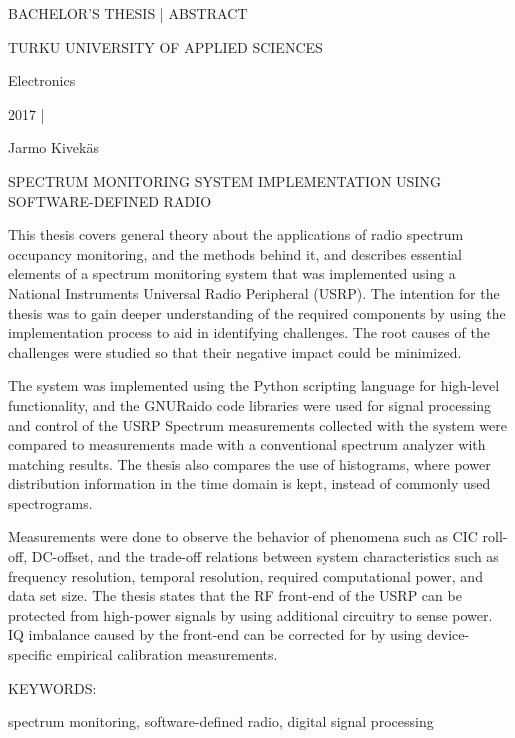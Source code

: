 BACHELOR'S THESIS | ABSTRACT

TURKU UNIVERSITY OF APPLIED SCIENCES

Electronics

2017 | \pageref{LastPage}


\vspace{7mm}
{\Large Jarmo Kivekäs \par}

\vspace{7mm}
{\huge SPECTRUM MONITORING SYSTEM IMPLEMENTATION USING SOFTWARE-DEFINED RADIO \par}

\vspace{7mm}




This thesis covers general theory about the applications of radio spectrum occupancy
monitoring, and the methods behind it, and describes essential elements of a
spectrum monitoring system that was implemented using a National Instruments Universal Radio Peripheral (USRP).
The intention for the thesis was to gain deeper understanding of the required components
by using the implementation process to aid in identifying challenges.
The root causes of the challenges were studied so that their negative impact could be minimized.

The system was implemented using the Python scripting language for high-level functionality, and the GNURaido
code libraries were used for signal processing and control of the USRP
Spectrum measurements collected with the system were compared to measurements made with a conventional spectrum analyzer with matching results.
The thesis also compares the use of histograms, where power distribution information in the time domain is kept, instead of commonly used spectrograms.


Measurements were done to observe the behavior of phenomena such as CIC roll-off,
DC-offset, and the trade-off relations between system characteristics such as
frequency resolution, temporal resolution, required computational power,
and data set size.
The thesis states that the RF front-end of the USRP can be protected from high-power signals by using additional circuitry to sense power. IQ imbalance caused by the front-end can be corrected for by using device-specific
empirical calibration measurements.


\vspace{15mm}

KEYWORDS:

spectrum monitoring, software-defined radio, digital signal processing

